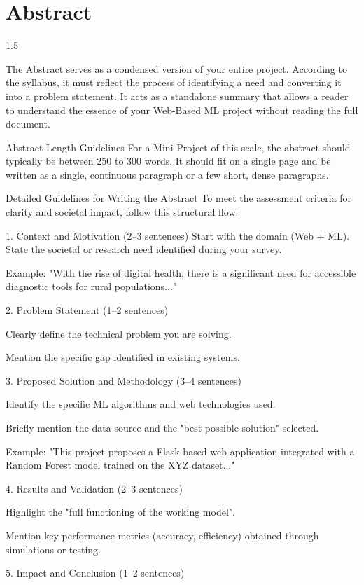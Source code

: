 \chapter*{Abstract}
\begin{spacing}{1.5}
	
The Abstract serves as a condensed version of your entire project. According to the syllabus, it must reflect the process of identifying a need and converting it into a problem statement. It acts as a standalone summary that allows a reader to understand the essence of your Web-Based ML project without reading the full document.

Abstract Length Guidelines
For a Mini Project of this scale, the abstract should typically be between 250 to 300 words. It should fit on a single page and be written as a single, continuous paragraph or a few short, dense paragraphs.

Detailed Guidelines for Writing the Abstract
To meet the assessment criteria for clarity and societal impact, follow this structural flow:

1. Context and Motivation (2–3 sentences)
Start with the domain (Web + ML).
State the societal or research need identified during your survey.

Example: "With the rise of digital health, there is a significant need for accessible diagnostic tools for rural populations..."

2. Problem Statement (1–2 sentences)

Clearly define the technical problem you are solving.

Mention the specific gap identified in existing systems.

3. Proposed Solution and Methodology (3–4 sentences)

Identify the specific ML algorithms and web technologies used.

Briefly mention the data source and the "best possible solution" selected.

Example: "This project proposes a Flask-based web application integrated with a Random Forest model trained on the XYZ dataset..."

4. Results and Validation (2–3 sentences)

Highlight the "full functioning of the working model".

Mention key performance metrics (accuracy, efficiency) obtained through simulations or testing.

5. Impact and Conclusion (1–2 sentences)


\end{spacing}
